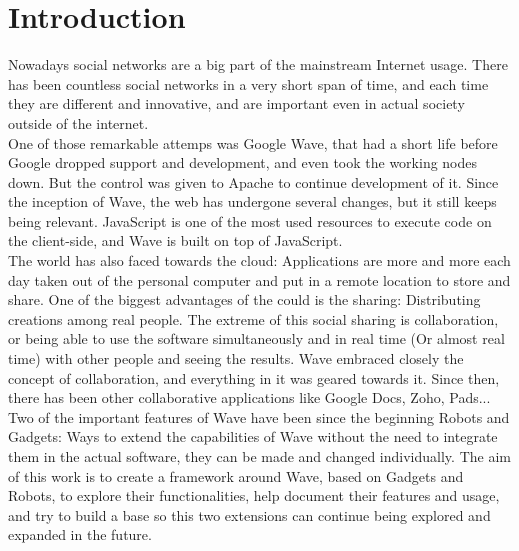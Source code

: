 \newpage
{}
\section{Introduction}
Nowadays social networks are a big part of the mainstream Internet usage. There has been countless social networks in a very short span of time, and each time they are different and innovative, and are important even in actual society outside of the internet.\\[.2cm]
One of those remarkable attemps was Google Wave, that had a short life before Google dropped support and development, and even took the working nodes down. But the control was given to Apache to continue development of it. Since the inception of Wave, the web has undergone several changes, but it still keeps being relevant. JavaScript is one of the most used resources to execute code on the client-side, and Wave is built on top of JavaScript.\\[.2cm]
The world has also faced towards the cloud: Applications are more and more each day taken out of the personal computer and put in a remote location to store and share. One of the biggest advantages of the could is the sharing: Distributing creations among real people. The extreme of this social sharing is collaboration, or being able to use the software simultaneously and in real time (Or almost real time) with other people and seeing the results. Wave embraced closely the concept of collaboration, and everything in it was geared towards it. Since then, there has been other collaborative applications like Google Docs, Zoho, Pads...\\[.2cm]
Two of the important features of Wave have been since the beginning Robots and Gadgets: Ways to extend the capabilities of Wave without the need to integrate them in the actual software, they can be made and changed individually. The aim of this work is to create a framework around Wave, based on Gadgets and Robots, to explore their functionalities, help document their features and usage, and try to build a base so this two extensions can continue being explored and expanded in the future.
